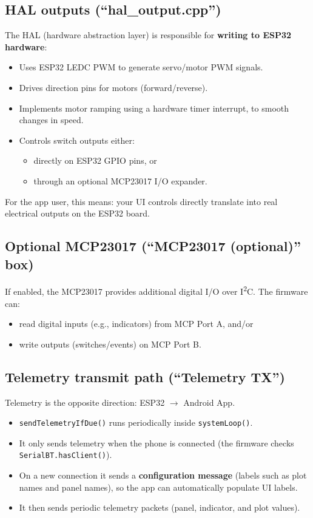 \documentclass[a3paper,11pt]{article}
\begin{document}
\subsection{HAL outputs (``hal\_output.cpp'')}
The HAL (hardware abstraction layer) is responsible for \textbf{writing to ESP32 hardware}:

\begin{itemize}
	\item Uses ESP32 LEDC PWM to generate servo/motor PWM signals.
	\item Drives direction pins for motors (forward/reverse).
	\item Implements motor ramping using a hardware timer interrupt, to smooth changes in speed.
	\item Controls switch outputs either:
	      \begin{itemize}
		      \item directly on ESP32 GPIO pins, or
		      \item through an optional MCP23017 I/O expander.
	      \end{itemize}
\end{itemize}

For the app user, this means: your UI controls directly translate into real electrical outputs on the ESP32 board.

\subsection{Optional MCP23017 (``MCP23017 (optional)'' box)}
If enabled, the MCP23017 provides additional digital I/O over I\textsuperscript{2}C.
The firmware can:
\begin{itemize}
	\item read digital inputs (e.g., indicators) from MCP Port A, and/or
	\item write outputs (switches/events) on MCP Port B.
\end{itemize}

\subsection{Telemetry transmit path (``Telemetry TX'')}
Telemetry is the opposite direction: ESP32 $\rightarrow$ Android App.

\begin{itemize}
	\item \texttt{sendTelemetryIfDue()} runs periodically inside \texttt{systemLoop()}.
	\item It only sends telemetry when the phone is connected (the firmware checks \texttt{SerialBT.hasClient()}).
	\item On a new connection it sends a \textbf{configuration message} (labels such as plot names and panel names),
	      so the app can automatically populate UI labels.
	\item It then sends periodic telemetry packets (panel, indicator, and plot values).
\end{itemize}
\end{document}
